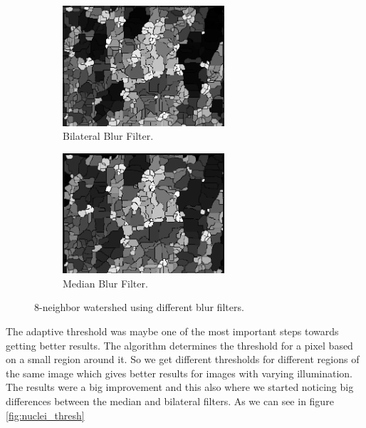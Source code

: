 \documentclass{article}
\begin{document}
\begin{figure}[H]
\centering
\begin{subfigure}{6cm}
  \centering
  \includegraphics[width=6cm]{experiments/nuclei/bilateral_nucleiseg.png}
  \caption{Bilateral Blur Filter.}
\end{subfigure}    
\begin{subfigure}{6cm}
  \centering
  \includegraphics[width=6cm]{experiments/nuclei/median_nucleiseg.png}
  \caption{Median Blur Filter.}
\end{subfigure}
\caption{8-neighbor watershed using different blur filters.}
\label{fig:nuclei_blurcomp}
\end{figure}
\begin{flushleft}
The adaptive threshold was maybe one of the most important steps towards getting better results. The algorithm determines the threshold for a pixel based on a small region around it. So we get different thresholds for different regions of the same image which gives better results for images with varying illumination. The results were a big improvement and this also where we started noticing big differences between the median and bilateral filters. As we can see in figure \ref{fig:nuclei_thresh}
\end{flushleft}
\end{document}
